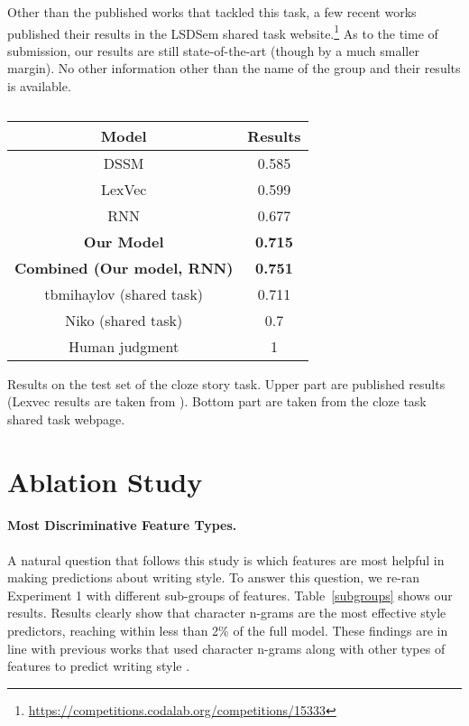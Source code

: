 \documentclass[11pt,a4paper]{article}
\newcommand{\tabref}[1]{Table~\ref{#1}}
\newcommand{\isection}[2]{\section{#1}\label{ssec:#2}}
\begin{document}
Other than the published works that tackled this task, a few  recent works published their results in the LSDSem shared task website.\footnote{\url{https://competitions.codalab.org/competitions/15333}} 
As to the time of submission, our results are still state-of-the-art (though by a much smaller margin). No other information other than the name of the group and their results is available.

\begin{table}[!t]
\begin{center}
\small
\begin{tabular}{|c|c|} \hline
{\bf Model} & {\bf Results} \\ \hline
{DSSM} \cite{Mostafazadeh:2016} & 0.585 \\ \hline
{ LexVec} \cite{Salle:2016} & 0.599 \\ \hline
{RNN}		& 0.677 \\ \hline
{\bf Our Model} & {\bf 0.715} \\ \hline
{\bf Combined (Our model, RNN)} & {\bf 0.751} \\ \hline\hline
{ tbmihaylov (shared task)} & 0.711\\ \hline
{ Niko (shared task)}	& 0.7\\ \hline\hline
Human judgment & 1 \\ \hline
\end{tabular}
\end{center}
\caption{\label{cloze_results}}
Results on the test set of the cloze story task. 
Upper part are published results (Lexvec results are taken from \cite{Speer:2016}).
Bottom part are taken from the cloze task shared task webpage.
\end{table}




\isection{Ablation Study}{Ablation}

\paragraph{Most Discriminative Feature Types.}
A natural question that follows this study is which features are most helpful in making predictions about writing style. 
To answer this question, we re-ran Experiment 1 with different sub-groups of features. 
\tabref{subgroups} shows our results. Results clearly show that  character n-grams are the most effective style predictors, reaching within less than 2\% of the full model.
These findings are in line with previous works that used character n-grams along with other types of features to predict writing  style \cite{Schwartz:2013}.
\end{document}

